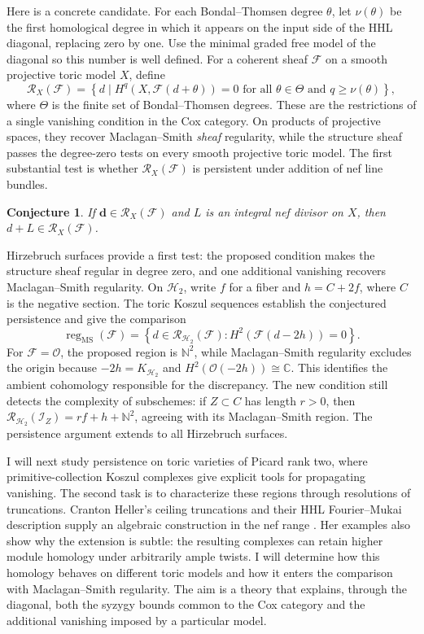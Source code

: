 \documentclass[11pt,reqno]{amsart}
\newtheorem{conjecture}[lemma]{Conjecture}
\theoremstyle{remark}
\newcommand{\dd}{\mathbf{d}}
\newcommand{\cF}{\mathcal{F}}
\newcommand{\cR}{\mathcal{R}}
\begin{document}
Here is a concrete candidate. For each Bondal--Thomsen degree $\theta$, let $\nu(\theta)$ be the first homological degree in which it appears on the input side of the HHL diagonal, replacing zero by one. Use the minimal graded free model of the diagonal so this number is well defined. For a coherent sheaf $\mathcal F$ on a smooth projective toric model $X$, define
\[
\cR_X(\cF)=\left\{d \; \big| \; H^q\left(X,\mathcal F(d+\theta)\right)=0 \text{ for all }\theta\in\Theta\text{ and }q\geq\nu(\theta)\right\},
\]
where $\Theta$ is the finite set of Bondal--Thomsen degrees. These are the restrictions of a single vanishing condition in the Cox category. On products of projective spaces, they recover Maclagan--Smith \emph{sheaf} regularity, while the structure sheaf passes the degree-zero tests on every smooth projective toric model. The first substantial test is whether $\cR_X(\cF)$ is persistent under addition of nef line bundles. 

\begin{conjecture}
 If $\dd\in \cR_X(\cF)$ and $L$ is an integral nef divisor on $X$, then $d+L\in\cR_X(\cF)$.
\end{conjecture}

Hirzebruch surfaces provide a first test: the proposed condition makes the structure sheaf regular in degree zero, and one additional vanishing recovers Maclagan--Smith regularity. On $\mathcal H_2$, write $f$ for a fiber and $h=C+2f$, where $C$ is the negative section. The toric Koszul sequences establish the conjectured persistence and give the comparison
\[
\operatorname{reg}_{\mathrm{MS}}(\mathcal F)
=\left\{d\in\mathcal R_{\mathcal H_2}(\mathcal F):
H^2\!\left(\mathcal F(d-2h)\right)=0\right\}.
\]
For $\mathcal F=\mathcal O$, the proposed region is $\mathbb N^2$, while Maclagan--Smith regularity excludes the origin because $-2h=K_{\mathcal H_2}$ and $H^2(\mathcal O(-2h))\cong\mathbb C$. This identifies the ambient cohomology responsible for the discrepancy. The new condition still detects the complexity of subschemes: if $Z\subset C$ has length $r>0$, then $\mathcal R_{\mathcal H_2}(\mathcal I_Z)=rf+h+\mathbb N^2$, agreeing with its Maclagan--Smith region. The persistence argument extends to all Hirzebruch surfaces.

I will next study persistence on toric varieties of Picard rank two, where primitive-collection Koszul complexes give explicit tools for propagating vanishing. The second task is to characterize these regions through resolutions of truncations. Cranton Heller's ceiling truncations and their HHL Fourier--Mukai description supply an algebraic construction in the nef range \cite{CH25}. Her examples also show why the extension is subtle: the resulting complexes can retain higher module homology under arbitrarily ample twists. I will determine how this homology behaves on different toric models and how it enters the comparison with Maclagan--Smith regularity. The aim is a theory that explains, through the diagonal, both the syzygy bounds common to the Cox category and the additional vanishing imposed by a particular model.
\end{document}
